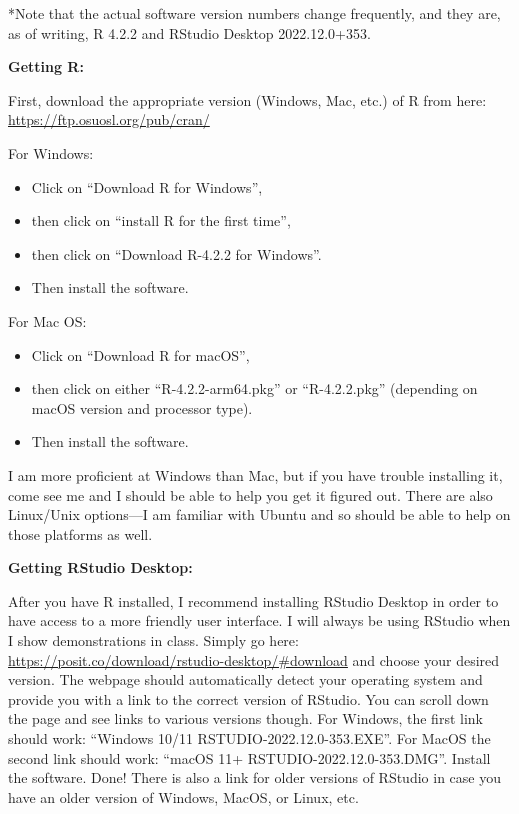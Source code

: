 \documentclass[
]{article}
\begin{document}
*Note that the actual software version numbers change frequently, and they are, as of writing, R 4.2.2 and RStudio Desktop 2022.12.0+353.

\textbf{Getting R:}

First, download the appropriate version (Windows, Mac, etc.) of R from here: \url{https://ftp.osuosl.org/pub/cran/}

For Windows:

\begin{itemize}
\item
  Click on ``Download R for Windows'',
\item
  then click on ``install R for the first time'',
\item
  then click on ``Download R-4.2.2 for Windows''.
\item
  Then install the software.
\end{itemize}

For Mac OS:

\begin{itemize}
\item
  Click on ``Download R for macOS'',
\item
  then click on either ``R-4.2.2-arm64.pkg'' or ``R-4.2.2.pkg'' (depending on macOS version and processor type).
\item
  Then install the software.
\end{itemize}

I am more proficient at Windows than Mac, but if you have trouble installing it, come see me and I should be able to help you get it figured out.
There are also Linux/Unix options---I am familiar with Ubuntu and so should be able to help on those platforms as well.

\textbf{Getting RStudio Desktop:}

After you have R installed, I recommend installing RStudio Desktop in order to have access to a more friendly user interface.
I will always be using RStudio when I show demonstrations in class.
Simply go here: \url{https://posit.co/download/rstudio-desktop/\#download} and choose your desired version.
The webpage should automatically detect your operating system and provide you with a link to the correct version of RStudio.
You can scroll down the page and see links to various versions though.
For Windows, the first link should work: ``Windows 10/11 RSTUDIO-2022.12.0-353.EXE''.
For MacOS the second link should work: ``macOS 11+ RSTUDIO-2022.12.0-353.DMG''.
Install the software.
Done!
There is also a link for older versions of RStudio in case you have an older version of Windows, MacOS, or Linux, etc.
\end{document}
